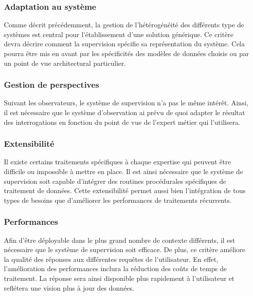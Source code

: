 \subsubsection{Adaptation au système}\label{sec:rw:supervision:criteres:adaptation}
Comme décrit précédemment, la gestion de l'hétérogénéité des différents type de systèmes est central pour l'établissement d'une solution générique. Ce critère devra décrire comment la supervision spécifie sa représentation du système. Cela pourra être mis en avant par les spécificités des modèles de données choisis ou par un point de vue architectural particulier.

\subsubsection{Gestion de perspectives}
Suivant les observateurs, le système de supervision n'a pas le même intérêt. Ainsi, il est nécessaire que le système d'observation ai prévu de quoi adapter le résultat des interrogations en fonction du point de vue de l'expert métier qui l'utilisera.

\subsubsection{Extensibilité}
Il existe certains traitements spécifiques à chaque expertise qui peuvent être difficile ou impossible à mettre en place. Il est ainsi nécessaire que le système de supervision soit capable d'intégrer des routines procédurales spécifiques de traitement de données. Cette extensibilité permet aussi bien l'intégration de tous types de besoins que d'améliorer les performances de traitements récurrents.

\subsubsection{Performances}
Afin d'être déployable dans le plus grand nombre de contexte différents, il est nécessaire que le système de supervision soit efficace. De plus, ce critère améliore la qualité des réponses aux différentes requêtes de l'utilisateur. En effet, l'amélioration des performances inclura la réduction des coûts de temps de traitement. La réponse sera ainsi disponible plus rapidement à l'utilisateur et reflétera une vision plus à jour des données.